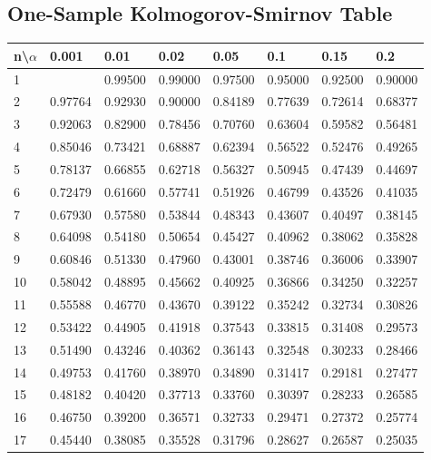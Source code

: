 \documentclass[11pt]{article}
\begin{document}
\begin{appendices}
\section{One-Sample Kolmogorov-Smirnov Table}\label{kstable}
\begin{table}[]
\centering
\begin{tabular}{|l|l|l|l|l|l|l|l|}
\hline
   n\textbackslash$\alpha$& 0.001   & 0.01    & 0.02    & 0.05    & 0.1     & 0.15    & 0.2     \\ \hline
1  &         & 0.99500 & 0.99000 & 0.97500 & 0.95000 & 0.92500 & 0.90000 \\ \hline
2  & 0.97764 & 0.92930 & 0.90000 & 0.84189 & 0.77639 & 0.72614 & 0.68377 \\ \hline
3  & 0.92063 & 0.82900 & 0.78456 & 0.70760 & 0.63604 & 0.59582 & 0.56481 \\ \hline
4  & 0.85046 & 0.73421 & 0.68887 & 0.62394 & 0.56522 & 0.52476 & 0.49265 \\ \hline
5  & 0.78137 & 0.66855 & 0.62718 & 0.56327 & 0.50945 & 0.47439 & 0.44697 \\ \hline
6  & 0.72479 & 0.61660 & 0.57741 & 0.51926 & 0.46799 & 0.43526 & 0.41035 \\ \hline
7  & 0.67930 & 0.57580 & 0.53844 & 0.48343 & 0.43607 & 0.40497 & 0.38145 \\ \hline
8  & 0.64098 & 0.54180 & 0.50654 & 0.45427 & 0.40962 & 0.38062 & 0.35828 \\ \hline
9  & 0.60846 & 0.51330 & 0.47960 & 0.43001 & 0.38746 & 0.36006 & 0.33907 \\ \hline
10 & 0.58042 & 0.48895 & 0.45662 & 0.40925 & 0.36866 & 0.34250 & 0.32257 \\ \hline
11 & 0.55588 & 0.46770 & 0.43670 & 0.39122 & 0.35242 & 0.32734 & 0.30826 \\ \hline
12 & 0.53422 & 0.44905 & 0.41918 & 0.37543 & 0.33815 & 0.31408 & 0.29573 \\ \hline
13 & 0.51490 & 0.43246 & 0.40362 & 0.36143 & 0.32548 & 0.30233 & 0.28466 \\ \hline
14 & 0.49753 & 0.41760 & 0.38970 & 0.34890 & 0.31417 & 0.29181 & 0.27477 \\ \hline
15 & 0.48182 & 0.40420 & 0.37713 & 0.33760 & 0.30397 & 0.28233 & 0.26585 \\ \hline
16 & 0.46750 & 0.39200 & 0.36571 & 0.32733 & 0.29471 & 0.27372 & 0.25774 \\ \hline
17 & 0.45440 & 0.38085 & 0.35528 & 0.31796 & 0.28627 & 0.26587 & 0.25035 \\ \hline

\end{tabular}
\end{table}
\end{appendices}
\end{document}

